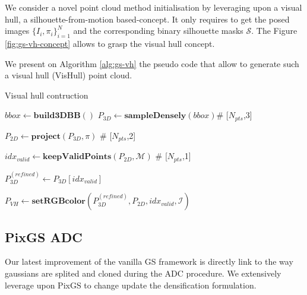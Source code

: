 We consider a novel point cloud method initialisation by leveraging upon a visual hull, a silhouette-from-motion \citep{baumgart1974geometric} based-concept. It only requires to get the posed images $\{I_{i},\pi_{i}\}_{i=1}^{N}$ and the corresponding binary silhouette masks $\mathcal{S}$. The Figure \ref{fig:gs-vh-concept} allows to grasp the visual hull concept. 

We present on Algorithm \ref{alg:gs-vh} the pseudo code that allow to generate such a visual hull (VisHull) point cloud. 

\begin{algorithm}[htpb!]
  \caption{Visual hull contruction}\label{alg:gs-vh}
  \medskip
  \medskip
  $bbox \gets \mathbf{build3DBB}()$ 
  $P_{3D} \gets \mathbf{sampleDensely}(bbox)$\hspace{.4cm}\textcolor{gray!80}{\# 
    [$N_{pts}$,3]} 

   $P_{2D} \gets \mathbf{project}(P_{3D},\pi)$ \hspace{.4cm}\textcolor{gray!80}{\# 
    [$N_{pts}$,2]} 
    
    $idx_{valid} \gets \mathbf{keepValidPoints}(P_{2D},\mathcal{M})$ \hspace{.4cm}\textcolor{gray!80}{\# 
    [$N_{pts}$,1]} 

    $P_{3D}^{(refined)} \gets P_{3D}[idx_{valid}]$ 

    $P_{VH} \gets \mathbf{setRGBcolor}(P_{3D}^{(refined)},P_{2D},idx_{valid},\mathcal{I})$ 
\end{algorithm}

\newpage

\subsection{PixGS ADC}
\label{gs:pixgs-adc}
Our latest improvement of the vanilla GS framework is directly link to the way gaussians are splited and cloned during the \ac{ADC} procedure. We extensively leverage upon PixGS \cite{zhang2024pixelgs} to change update the densification formulation.  

